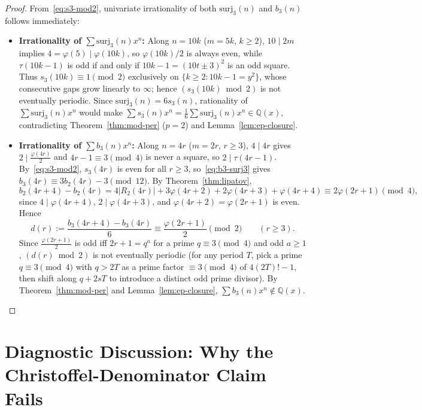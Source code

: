 \documentclass[11pt,a4paper]{article}
\theoremstyle{definition}
\newcommand{\Q}{\mathbb{Q}}
\newcommand{\surj}{\mathrm{surj}}
\begin{document}
\begin{proof}
From~\eqref{eq:s3-mod2}, univariate irrationality of both $\surj_3(n)$ and $b_3(n)$ follows immediately:
\begin{itemize}
  \item \textbf{Irrationality of $\sum \surj_3(n)x^n$:} Along $n = 10k$ ($m = 5k$, $k \ge 2$), $10 \mid 2m$ implies $4 = \varphi(5) \mid \varphi(10k)$, so $\varphi(10k)/2$ is always even, while $\tau(10k - 1)$ is odd if and only if $10k - 1 = (10t \pm 3)^2$ is an odd square. Thus $s_3(10k) \equiv 1 \pmod 2$ exclusively on $\{k \ge 2 : 10k - 1 = y^2\}$, whose consecutive gaps grow linearly to $\infty$; hence $(s_3(10k) \bmod 2)$ is not eventually periodic. Since $\surj_3(n) = 6s_3(n)$, rationality of $\sum \surj_3(n)x^n$ would make $\sum s_3(n)x^n = \frac{1}{6}\sum \surj_3(n)x^n \in \Q(x)$, contradicting Theorem~\ref{thm:mod-per} ($p = 2$) and Lemma~\ref{lem:ep-closure}.
  \item \textbf{Irrationality of $\sum b_3(n)x^n$:} Along $n = 4r$ ($m = 2r$, $r \ge 3$), $4 \mid 4r$ gives $2 \mid \frac{\varphi(4r)}{2}$ and $4r - 1 \equiv 3 \pmod 4$ is never a square, so $2 \mid \tau(4r - 1)$. By~\eqref{eq:s3-mod2}, $s_3(4r)$ is even for all $r \ge 3$, so~\eqref{eq:b3-surj3} gives $b_3(4r) \equiv 3b_2(4r) - 3 \pmod{12}$. By Theorem~\ref{thm:lipatov},
  \[
    b_2(4r+4) - b_2(4r) = 4|R_2(4r)| + 3\varphi(4r+2) + 2\varphi(4r+3) + \varphi(4r+4) \equiv 2\varphi(2r+1) \pmod 4,
  \]
  since $4 \mid \varphi(4r+4)$, $2 \mid \varphi(4r+3)$, and $\varphi(4r+2) = \varphi(2r+1)$ is even. Hence
  \[
    d(r) := \frac{b_3(4r+4) - b_3(4r)}{6} \equiv \frac{\varphi(2r+1)}{2} \pmod 2 \qquad (r \ge 3).
  \]
  Since $\frac{\varphi(2r+1)}{2}$ is odd iff $2r + 1 = q^a$ for a prime $q \equiv 3 \pmod 4$ and odd $a \ge 1$, $(d(r) \bmod 2)$ is not eventually periodic (for any period $T$, pick a prime $q \equiv 3 \pmod 4$ with $q > 2T$ as a prime factor $\equiv 3 \pmod 4$ of $4(2T)! - 1$, then shift along $q + 2sT$ to introduce a distinct odd prime divisor). By Theorem~\ref{thm:mod-per} and Lemma~\ref{lem:ep-closure}, $\sum b_3(n)x^n \notin \Q(x)$.
\end{itemize}
\end{proof}

\section{Diagnostic Discussion: Why the Christoffel-Denominator Claim Fails}
\end{document}
